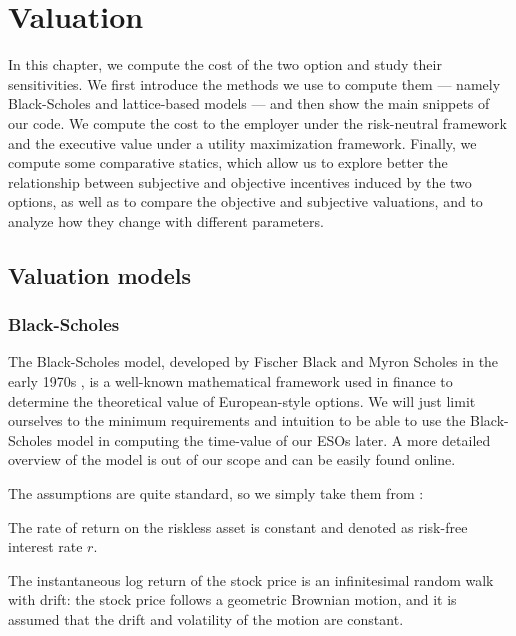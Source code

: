 \section{Valuation}

    In this chapter, we compute the cost of the two option and study their sensitivities. We first introduce the methods we use to compute them --- namely Black-Scholes and lattice-based models --- and then show the main snippets of our code. We compute the cost to the employer under the risk-neutral framework and the executive value under a utility maximization framework. Finally, we compute some comparative statics, which allow us to explore better the relationship between subjective and objective incentives induced by the two options, as well as to compare the objective and subjective valuations, and to analyze how they change with different parameters.


\subsection{Valuation models} 

\subsubsection{Black-Scholes}
    The Black-Scholes model, developed by Fischer Black and Myron Scholes in the early 1970s \citep{black1973pricing}, is a well-known mathematical framework used in finance to determine the theoretical value of European-style options. We will just limit ourselves to the minimum requirements and intuition to be able to use the Black-Scholes model in computing the time-value of our ESOs later. A more detailed overview of the model is out of our scope and can be easily found online. 
    
    The assumptions are quite standard, so we simply take them from \citet{wiki:blackscholes}:

    \begin{assumption}
        \label{ass:bs_1}
        The rate of return on the riskless asset is constant and denoted as risk-free interest rate $r$.
    \end{assumption}
    

    \begin{assumption}
        \label{ass: bs_2}
        The instantaneous log return of the stock price is an infinitesimal random walk with drift: the stock price follows a geometric Brownian motion, and it is assumed that the drift and volatility of the motion are constant.
    \end{assumption}

